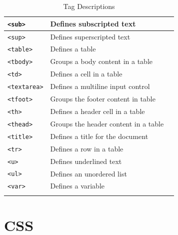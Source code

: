 \documentclass[11pt, letterpaper]{article}
\begin{document}
\begin{longtable}{l p{10cm} l}
			\texttt{<sub>} & Defines subscripted text\\\midrule
			\texttt{<sup>} & Defines superscripted text\\\midrule
			\texttt{<table>} & Defines a table\\\midrule
			\texttt{<tbody>} & Groups a body content in a table\\\midrule
			\texttt{<td>} & Defines a cell in a table\\\midrule
			\texttt{<textarea>} & Defines a multiline input control\\\midrule
			\texttt{<tfoot>} & Groups the footer content in table\\\midrule
			\texttt{<th>} & Defines a header cell in a table\\\midrule
			\texttt{<thead>} & Groups the header content in a table\\\midrule
			\texttt{<title>} & Defines a title for the document\\\midrule
			\texttt{<tr>} & Defines a row in a table\\\midrule
			\texttt{<u>} & Defines underlined text\\\midrule
			\texttt{<ul>} & Defines an unordered list\\\midrule
			\texttt{<var>} & Defines a variable\\
			\bottomrule

			\caption{Tag Descriptions}
		\end{longtable}
	\section{CSS}
\end{document}
